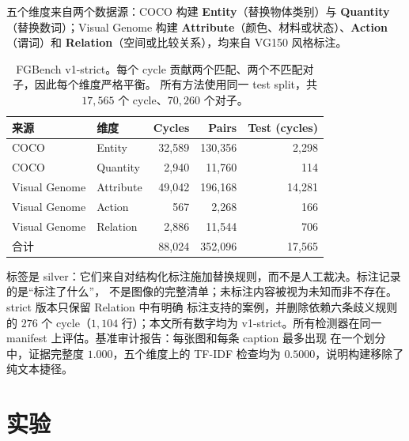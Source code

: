 \documentclass[10pt,twocolumn,a4paper]{ctexart}
\begin{document}
五个维度来自两个数据源：COCO 构建 \textbf{Entity}（替换物体类别）与 \textbf{Quantity}
（替换数词）；Visual Genome 构建 \textbf{Attribute}（颜色、材料或状态）、\textbf{Action}
（谓词）和 \textbf{Relation}（空间或比较关系），均来自 VG150 风格标注。

\begin{table}[t]
\centering
\small
\setlength{\tabcolsep}{2pt}
\caption{FGBench v1-strict。每个 cycle 贡献两个匹配、两个不匹配对子，因此每个维度严格平衡。
所有方法使用同一 test split，共 $17{,}565$ 个 cycle、$70{,}260$ 个对子。}
\label{tab:fgbench-cn}
\begin{tabular}{llrrr}
\toprule
来源 & 维度 & Cycles & Pairs & Test (cycles) \\
\midrule
COCO          & Entity     & 32{,}589 & 130{,}356 &  2{,}298 \\
COCO          & Quantity   &  2{,}940 &  11{,}760 &    114 \\
Visual Genome & Attribute  & 49{,}042 & 196{,}168 & 14{,}281 \\
Visual Genome & Action     &    567   &   2{,}268 &    166 \\
Visual Genome & Relation   &  2{,}886 &  11{,}544 &    706 \\
\midrule
\multicolumn{2}{l}{合计}      & 88{,}024 & 352{,}096 & 17{,}565 \\
\bottomrule
\end{tabular}
\end{table}

标签是 silver：它们来自对结构化标注施加替换规则，而不是人工裁决。标注记录的是“标注了什么”，
不是图像的完整清单；未标注内容被视为未知而非不存在。strict 版本只保留 Relation 中有明确
标注支持的案例，并删除依赖六条歧义规则的 $276$ 个 cycle（$1{,}104$ 行）；本文所有数字均为
v1-strict。所有检测器在同一 manifest 上评估。基准审计报告：每张图和每条 caption 最多出现
在一个划分中，证据完整度 $1.000$，五个维度上的 TF-IDF 检查均为 $0.5000$，说明构建移除了
纯文本捷径。

\section{实验}
\label{sec:exp-cn}
\end{document}
